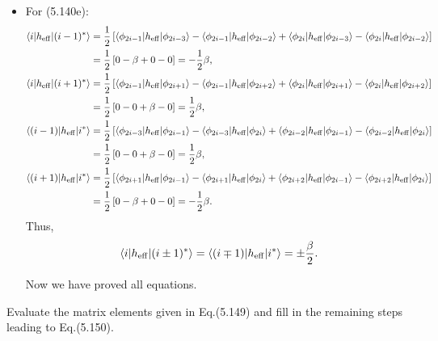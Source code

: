 \documentclass[a4paper]{book}
\newcounter{exercise}[chapter]
\newcounter{solution}[chapter]
\newcommand{\heff}{h_{\rm eff}}
\begin{document}
\begin{solution}
\begin{itemize}
	\item For (5.140e):
	\begin{align*}
		\langle i | \heff | (i-1)^* \rangle &= \frac{1}{2} \left[ \langle \phi_{2i-1} | \heff | \phi_{2i-3} \rangle - \langle \phi_{2i-1} | \heff | \phi_{2i-2} \rangle + \langle \phi_{2i} | \heff | \phi_{2i-3} \rangle - \langle \phi_{2i} | \heff | \phi_{2i-2} \rangle \right] \\
		&= \frac{1}{2} \left[ 0 - \beta + 0 - 0 \right] = - \frac{1}{2} \beta , \\
		\langle i | \heff | (i+1)^* \rangle &= \frac{1}{2} \left[ \langle \phi_{2i-1} | \heff | \phi_{2i+1} \rangle - \langle \phi_{2i-1} | \heff | \phi_{2i+2} \rangle + \langle \phi_{2i} | \heff | \phi_{2i+1} \rangle - \langle \phi_{2i} | \heff | \phi_{2i+2} \rangle \right] \\
		&= \frac{1}{2} \left[ 0 - 0 + \beta - 0 \right] = \frac{1}{2} \beta , \\
		\langle (i-1) | \heff | i^* \rangle &= \frac{1}{2} \left[ \langle \phi_{2i-3} | \heff | \phi_{2i-1} \rangle - \langle \phi_{2i-3} | \heff | \phi_{2i} \rangle + \langle \phi_{2i-2} | \heff | \phi_{2i-1} \rangle - \langle \phi_{2i-2} | \heff | \phi_{2i} \rangle \right] \\
		&= \frac{1}{2} \left[ 0 - 0 + \beta - 0 \right] =  \frac{1}{2} \beta , \\
		\langle (i+1) | \heff | i^* \rangle &= \frac{1}{2} \left[ \langle \phi_{2i+1} | \heff | \phi_{2i-1} \rangle - \langle \phi_{2i+1} | \heff | \phi_{2i} \rangle + \langle \phi_{2i+2} | \heff | \phi_{2i-1} \rangle - \langle \phi_{2i+2} | \heff | \phi_{2i} \rangle \right] \\
		&= \frac{1}{2} \left[ 0 - \beta + 0 - 0 \right] = - \frac{1}{2} \beta .
	\end{align*}
	Thus,
	\[
		\langle i | \heff | (i \pm 1)^* \rangle = \langle (i \mp 1) | \heff | i^* \rangle = \pm \frac{ \beta }{ 2 }.
	\]
	
	Now we have proved all equations.
	
	\end{itemize}
	
	\end{solution}

	\begin{exercise}
	Evaluate the matrix elements given in Eq.(5.149) and fill in the remaining steps leading to Eq.(5.150).
	\end{exercise}
	
\end{document}
